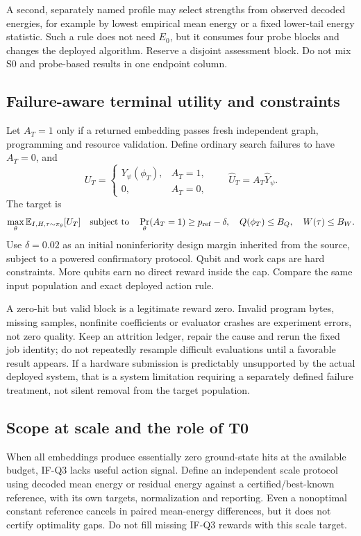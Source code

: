 A second, separately named profile may select strengths from observed decoded energies, for example by lowest empirical mean energy or a fixed lower-tail energy statistic. Such a rule does not need $E_0$, but it consumes four probe blocks and changes the deployed algorithm. Reserve a disjoint assessment block. Do not mix S0 and probe-based results in one endpoint column.

\subsection{Failure-aware terminal utility and constraints}
Let $A_T=1$ only if a returned embedding passes fresh independent graph, programming and resource validation. Define ordinary search failures to have $A_T=0$, and
\begin{equation}
U_T=\begin{cases}Y_\psi(\phi_T),&A_T=1,\\0,&A_T=0,\end{cases}
\qquad \widehat U_T=A_T\widehat Y_\psi.
\label{eq:utility}
\end{equation}
The target is
\begin{equation}
\max_\theta \mathbb{E}_{I,H,\tau\sim\pi_\theta}[U_T]
\quad\text{subject to}\quad
\Pr_\theta(A_T=1)\ge p_{\rm ref}-\delta,
\quad Q(\phi_T)\le B_Q,
\quad W(\tau)\le B_W.
\end{equation}
Use $\delta=0.02$ as an initial noninferiority design margin inherited from the source, subject to a powered confirmatory protocol. Qubit and work caps are hard constraints. More qubits earn no direct reward inside the cap. Compare the same input population and exact deployed action rule.

A zero-hit but valid block is a legitimate reward zero. Invalid program bytes, missing samples, nonfinite coefficients or evaluator crashes are experiment errors, not zero quality. Keep an attrition ledger, repair the cause and rerun the fixed job identity; do not repeatedly resample difficult evaluations until a favorable result appears. If a hardware submission is predictably unsupported by the actual deployed system, that is a system limitation requiring a separately defined failure treatment, not silent removal from the target population.

\subsection{Scope at scale and the role of T0}
When all embeddings produce essentially zero ground-state hits at the available budget, IF-Q3 lacks useful action signal. Define an independent scale protocol using decoded mean energy or residual energy against a certified/best-known reference, with its own targets, normalization and reporting. Even a nonoptimal constant reference cancels in paired mean-energy differences, but it does not certify optimality gaps. Do not fill missing IF-Q3 rewards with this scale target.

